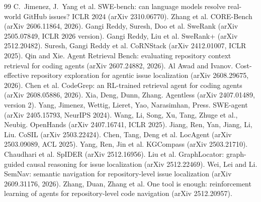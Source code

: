 \documentclass[10pt,twocolumn]{article}
\begin{document}
\begin{thebibliography}{99}\small
{} %
C.~Jimenez, J.~Yang et al. SWE-bench: can language models resolve real-world GitHub issues? ICLR 2024 (arXiv 2310.06770).
Zhang et al. CORE-Bench (arXiv 2606.11864, 2026).
Gangi Reddy, Suresh, Doo et al. SweRank (arXiv 2505.07849, ICLR 2026 version).
Gangi Reddy, Liu et al. SweRank+ (arXiv 2512.20482).
Suresh, Gangi Reddy et al. CoRNStack (arXiv 2412.01007, ICLR 2025).
Qin and Xie. Agent Retrieval Bench: evaluating repository context retrieval for coding agents (arXiv 2607.24882, 2026).
Al Awad and Ivanov. Cost-effective repository exploration for agentic issue localization (arXiv 2608.29675, 2026).
Chen et al. CodeGrep: an RL-trained retrieval agent for coding agents (arXiv 2608.05886, 2026).
Xia, Deng, Dunn, Zhang. Agentless (arXiv 2407.01489, version 2).
Yang, Jimenez, Wettig, Lieret, Yao, Narasimhan, Press. SWE-agent (arXiv 2405.15793, NeurIPS 2024).
Wang, Li, Song, Xu, Tang, Zhuge et al., Neubig. OpenHands (arXiv 2407.16741, ICLR 2025).
Jiang, Ren, Yan, Jiang, Li, Liu. CoSIL (arXiv 2503.22424).
Chen, Tang, Deng et al. LocAgent (arXiv 2503.09089, ACL 2025).
Yang, Ren, Jin et al. KGCompass (arXiv 2503.21710).
Chaudhari et al. SpIDER (arXiv 2512.16956).
Liu et al. GraphLocator: graph-guided causal reasoning for issue localization (arXiv 2512.22469).
Wei, Lei and Li. SemNav: semantic navigation for repository-level issue localization (arXiv 2609.31176, 2026).
Zhang, Duan, Zhang et al. One tool is enough: reinforcement learning of agents for repository-level code navigation (arXiv 2512.20957).

\end{thebibliography}
\end{document}
